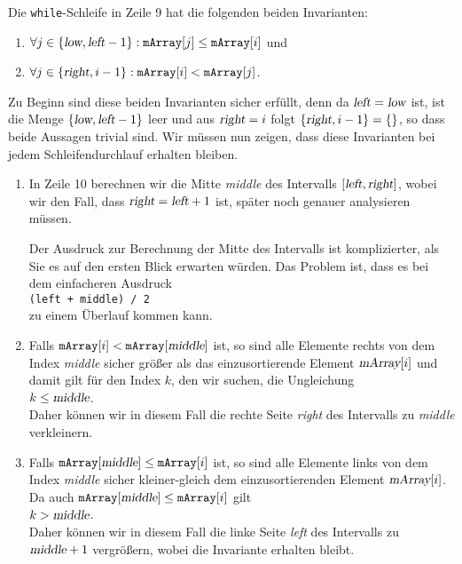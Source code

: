 Die \texttt{while}-Schleife in Zeile 9 hat die folgenden beiden Invarianten:
\begin{enumerate}
\item $\forall j \in \{ \textsl{low}, \textsl{left} - 1 \} : \mathtt{mArray}[j] \leq
  \mathtt{mArray}[i]$ \quad und
\item $\forall j \in \{ \textsl{right}, i - 1 \} : \mathtt{mArray}[i] < \mathtt{mArray}[j]$.
\end{enumerate}
Zu Beginn sind diese beiden Invarianten sicher erf\"ullt, denn da $\textsl{left} = \textsl{low}$ ist,
ist die Menge $\{ \textsl{low}, \textsl{left} - 1 \}$ leer und aus $\textsl{right} = i$ folgt
$\{ \textsl{right}, i - 1 \} = \{\}$, so dass beide Aussagen trivial sind.  Wir m\"ussen nun zeigen,
dass diese Invarianten bei jedem Schleifendurchlauf erhalten bleiben.
\begin{enumerate}
\item In Zeile 10 berechnen wir die Mitte \textsl{middle} des Intervalls $[\textsl{left}, \textsl{right}]$,
      wobei wir den Fall, dass $\textsl{right} = \textsl{left} + 1$ ist, sp\"ater noch genauer
      analysieren m\"ussen.

      Der Ausdruck zur Berechnung der Mitte des Intervalls ist komplizierter, als Sie es auf den
      ersten Blick erwarten w\"urden.  Das Problem ist, dass es bei dem einfacheren Ausdruck
      \\[0.2cm]
      \hspace*{1.3cm}
      \texttt{(left + middle) / 2}
      \\[0.2cm]
      zu einem \"Uberlauf kommen kann.
\item Falls $\mathtt{mArray}[i] < \mathtt{mArray}[\textsl{middle}]$ ist, so sind alle Elemente
      rechts von dem Index \textsl{middle} sicher gr\"o{\ss}er als das einzusortierende Element 
      $\textsl{mArray}[i]$ und damit gilt f\"ur den Index $k$, den wir suchen, die Ungleichung
      \\[0.2cm]
      \hspace*{1.3cm}
      $k \leq \textsl{middle}$.
      \\[0.2cm]
      Daher k\"onnen wir in diesem Fall die rechte Seite \textsl{right} des Intervalls zu \textsl{middle} verkleinern.
\item Falls $\mathtt{mArray}[\textsl{middle}] \leq \mathtt{mArray}[i]$ ist, so sind alle Elemente
      links von dem Index \textsl{middle} sicher kleiner-gleich dem einzusortierenden Element 
      $\textsl{mArray}[i]$. Da auch $\mathtt{mArray}[\textsl{middle}] \leq \mathtt{mArray}[i]$ gilt 
      \\[0.2cm]
      \hspace*{1.3cm}
      $k > \textsl{middle}$.
      \\[0.2cm]
      Daher k\"onnen wir in diesem Fall die linke Seite \textsl{left} des Intervalls zu $\textsl{middle}+1$
      vergr\"o{\ss}ern, wobei die Invariante erhalten bleibt.
\end{enumerate}
